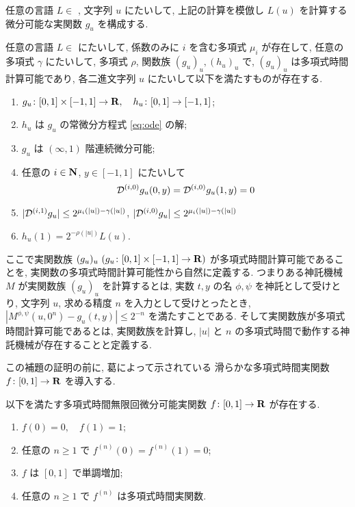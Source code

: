 任意の言語 $L \in $ \PSPACE, 文字列 $u$ にたいして,
上記の計算を模倣し $L(u)$ を計算する微分可能な実関数 $g_u$ を構成する.

\begin{lemma}
 \label{DifferentiableFamily}
 任意の言語 $L \in $ \PSPACE にたいして, 
 係数のみに $i$ を含む多項式 $\mu_i$ が存在して,
 任意の多項式 $\gamma$ にたいして,
 多項式 $\rho$, 関数族 $(g_u)_u, (h_u)_u$ で, 
 $(g_u)_u$ は多項式時間計算可能であり,
 各二進文字列 $u$ にたいして以下を満たすものが存在する.
 \begin{enumerate}
  \item $g_u\colon [0,1] \times [-1,1]\to \mathbf R, \quad h_u\colon [0,1] \to [-1,1]$;
  \item $h_u$ は $g_u$ の常微分方程式 \ref{eq:ode} の解; 
  \item $g_u$ は $(\infty, 1)$ 階連続微分可能;
  \item 任意の $i \in \mathbf N$, $y \in [-1,1]$ にたいして
	\begin{equation*}
	 \mathcal D^{(i, 0)} g_u(0,y) = \mathcal D^{(i, 0)} g_u(1,y) = 0 
	\end{equation*}
  \item $|\mathcal D^{(i,1)} g_u| \leq 2^{\mu_i (|u|) - \gamma(|u|)}$, \qquad
	$|\mathcal D^{(i,0)} g_u| \leq 2^{\mu_i (|u|) - \gamma(|u|)}$
  \item $h_u(1) = 2^{-\rho(|u|)}L(u)$.
 \end{enumerate}
\end{lemma}

 ここで実関数族 $(g_u)_u \ (g_u \colon [0,1] \times [-1, 1] \to \mathbf R)$ 
 が多項式時間計算可能であることを, 実関数の多項式時間計算可能性から自然に定義する.
 つまりある神託機械 $M$ が実関数族 $(g_u)_u$ を計算するとは,
 実数 $t,y$ の名 $\phi, \psi$ を神託として受けとり,
 文字列 $u$, 求める精度 $n$ を入力として受けとったとき,
 $|M^{\phi, \psi}(u, 0^n) - g_u(t, y)| \le 2^{-n}$ を満たすことである.
 そして実関数族が多項式時間計算可能であるとは,
 実関数族を計算し, $|u|$ と $n$ の多項式時間で動作する神託機械が存在することと定義する.

 この補題の証明の前に, 葛によって示されている
 滑らかな多項式時間実関数 $f \colon [0,1] \to \mathbf R$ を導入する.
 
 \begin{lemma}
  \label{SmoothFunction}
  以下を満たす多項式時間無限回微分可能実関数 $f \colon [0,1] \to \mathbf R$ が存在する.
  \begin{enumerate}
   \item $f(0) = 0, \quad f(1) = 1$;
   \item 任意の $n \ge 1$ で $f^{(n)}(0) = f^{(n)}(1) = 0$;
   \item $f$ は $[0,1]$ で単調増加;
   \item 任意の $n \ge 1$ で $f^{(n)}$ は多項式時間実関数.
  \end{enumerate}
 \end{lemma} 



